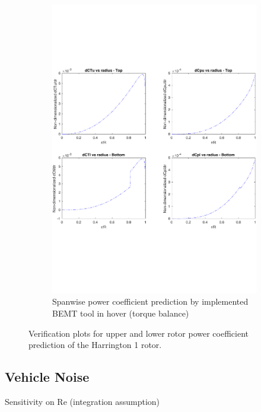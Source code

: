 \begin{figure}[H]
\begin{subfigure}[t]{0.5\textwidth}
    \includegraphics[width=\textwidth]{Figures/CP_plot.pdf}
    \caption{Spanwise power coefficient prediction by implemented BEMT tool in hover (torque balance)}
    \label{fig:disks}
\end{subfigure}
    \captionsetup{justification=centering}
    \caption{Verification plots for upper and lower rotor power coefficient prediction of the Harrington 1 rotor.}
    \label{fig:BEMT}
\end{figure}

\subsection{Vehicle Noise}


Sensitivity on Re (integration assumption)











